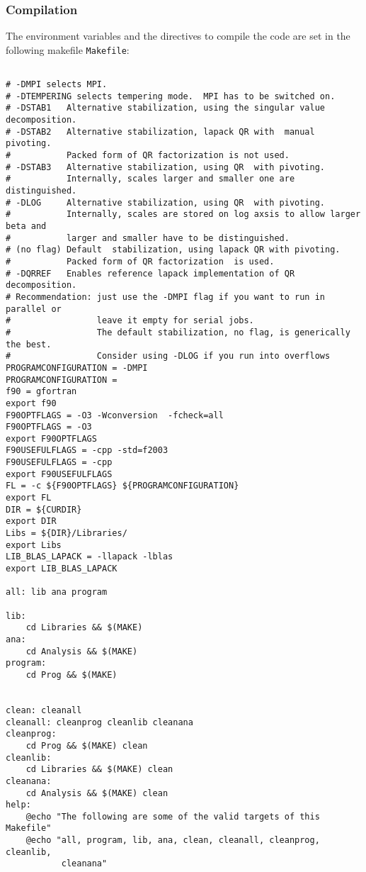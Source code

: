 \subsubsection{Compilation}
%
The environment variables and the directives to compile the code are set in the following makefile \texttt{Makefile}:
\lstset{style=bash}
\begin{lstlisting}

# -DMPI selects MPI.
# -DTEMPERING selects tempering mode.  MPI has to be switched on.
# -DSTAB1   Alternative stabilization, using the singular value decomposition.
# -DSTAB2   Alternative stabilization, lapack QR with  manual pivoting.
#           Packed form of QR factorization is not used.
# -DSTAB3   Alternative stabilization, using QR  with pivoting.
#           Internally, scales larger and smaller one are distinguished.
# -DLOG     Alternative stabilization, using QR  with pivoting.
#           Internally, scales are stored on log axsis to allow larger beta and
#           larger and smaller have to be distinguished.
# (no flag) Default  stabilization, using lapack QR with pivoting. 
#           Packed form of QR factorization  is used. 
# -DQRREF   Enables reference lapack implementation of QR decomposition.
# Recommendation: just use the -DMPI flag if you want to run in parallel or 
#                 leave it empty for serial jobs.  
#                 The default stabilization, no flag, is generically the best. 
#                 Consider using -DLOG if you run into overflows
PROGRAMCONFIGURATION = -DMPI 
PROGRAMCONFIGURATION = 
f90 = gfortran
export f90
F90OPTFLAGS = -O3 -Wconversion  -fcheck=all
F90OPTFLAGS = -O3
export F90OPTFLAGS
F90USEFULFLAGS = -cpp -std=f2003
F90USEFULFLAGS = -cpp
export F90USEFULFLAGS
FL = -c ${F90OPTFLAGS} ${PROGRAMCONFIGURATION}
export FL
DIR = ${CURDIR}
export DIR
Libs = ${DIR}/Libraries/
export Libs
LIB_BLAS_LAPACK = -llapack -lblas
export LIB_BLAS_LAPACK

all: lib ana program

lib:
	cd Libraries && $(MAKE)
ana:
	cd Analysis && $(MAKE)
program:
	cd Prog && $(MAKE)


clean: cleanall
cleanall: cleanprog cleanlib cleanana
cleanprog:
	cd Prog && $(MAKE) clean
cleanlib:
	cd Libraries && $(MAKE) clean
cleanana:
	cd Analysis && $(MAKE) clean
help:
	@echo "The following are some of the valid targets of this Makefile"
	@echo "all, program, lib, ana, clean, cleanall, cleanprog, cleanlib,
	       cleanana"

\end{lstlisting}
